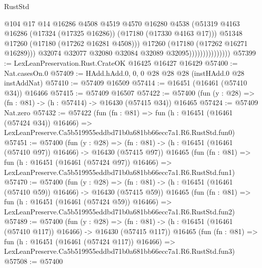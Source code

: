 \begin{lexlean}{RustStd}
\begin{coremodule}
                                      @104
                                      @17
                                      @14
                                      @16286
                                      @4508
                                      @4519
                                      @4570
                                      @16280
                                      @4538
                                      (@51319
                                        @4163
                                        @16286
                                        (@17324 (@17325 @16286))
                                        (@17180 (@17330 @4163 @17)))
                                      @51348
                                      @17260
                                      (@17180 (@17262 @16281 @4508)))
                                    @17260
                                    (@17180 (@17262 @16271 @16289)))
                                  @32074
                                  @32077
                                  @32080
                                  @32084
                                  @32089
                                  @32095)))))))))))))))
@57399 := LexLeanPreservation.Rust.CrateOK @16425 @16427 @16429
@57400 := Nat.casesOn.{0}
@57409 := HAdd.hAdd.{0, 0, 0} @28 @28 @28 (instHAdd.{0} @28 instAddNat)
@57410 := @57409 @16509
@57414 := @16451 (@16461 (@57410 @34)) @16466
@57415 := @57409 @16507
@57422 := @57400 (fun (y : @28) => (fn : @81) -> (h : @57414) -> @16430 (@57415 @34)) @16465
@57424 := @57409 Nat.zero
@57432 := @57422
    (fun (fn : @81) =>
    fun (h : @16451 (@16461 (@57424 @34)) @16466) =>
    LexLeanPreserve.Ca5b519955eddbd71b0a681bb66ecc7a1.R6.RustStd.fun0)
@57451 := @57400
    (fun (y : @28) =>
    (fn : @81) -> (h : @16451 (@16461 (@57410 @97)) @16466) -> @16430 (@57415 @97))
    @16465
    (fun (fn : @81) =>
    fun (h : @16451 (@16461 (@57424 @97)) @16466) =>
    LexLeanPreserve.Ca5b519955eddbd71b0a681bb66ecc7a1.R6.RustStd.fun1)
@57470 := @57400
    (fun (y : @28) =>
    (fn : @81) -> (h : @16451 (@16461 (@57410 @59)) @16466) -> @16430 (@57415 @59))
    @16465
    (fun (fn : @81) =>
    fun (h : @16451 (@16461 (@57424 @59)) @16466) =>
    LexLeanPreserve.Ca5b519955eddbd71b0a681bb66ecc7a1.R6.RustStd.fun2)
@57489 := @57400
    (fun (y : @28) =>
    (fn : @81) -> (h : @16451 (@16461 (@57410 @117)) @16466) -> @16430 (@57415 @117))
    @16465
    (fun (fn : @81) =>
    fun (h : @16451 (@16461 (@57424 @117)) @16466) =>
    LexLeanPreserve.Ca5b519955eddbd71b0a681bb66ecc7a1.R6.RustStd.fun3)
@57508 := @57400

\end{coremodule}
\end{lexlean}

